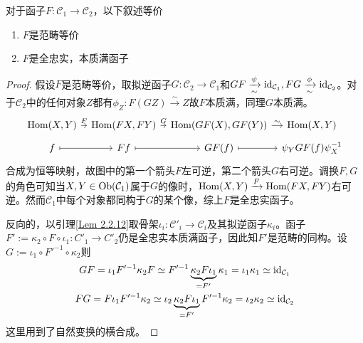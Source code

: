 \begin{Them}\label{Them 2.2.13}
    对于函子$F:\mathcal{C}_1 \to \mathcal{C}_2$，以下叙述等价
    \begin{enumerate}
        \item $F$是范畴等价
        \item $F$是全忠实，本质满函子
    \end{enumerate}
    \begin{proof}
        假设$F$是范畴等价，取拟逆函子$G:\mathcal{C}_2 \to \mathcal{C}_1$和$GF \xrightarrow[\sim]{\psi} \mathrm{id}_{\mathcal{C}_1}, FG\xrightarrow[\sim]{\phi} \mathrm{id}_{\mathcal{C}_2}$。对于$\mathcal{C}_2$中的任何对象$Z$都有$\phi_Z:F(GZ)\xrightarrow{\sim}Z$故$F$本质满，同理$G$本质满。
        \[\begin{tikzcd}[row sep = tiny, column sep = tiny]
            \Hom(X,Y)
                \arrow[r, "F"] &
            \Hom(FX, FY)
                \arrow[r, "G"] &
            \Hom(GF(X), GF(Y))
                \arrow[r, "\sim"] &
            \Hom(X,Y)  \\
            f 
                \arrow[mapsto,r] &
            F f 
                \arrow[mapsto, r] &
            G F(f)
                \arrow[mapsto, r] &
            \psi_Y GF(f) \psi_{X}^{-1}
        \end{tikzcd}\]
        合成为恒等映射，故图中的第一个箭头$F$左可逆，第二个箭头$G$右可逆。调换$F,G$的角色可知当$X,Y\in \operatorname{Ob}(\mathcal{C}_1)$属于$G$的像时，$\operatorname{Hom}(X,Y)\xrightarrow{F} \operatorname{Hom}(FX, FY)$右可逆。然而$\mathcal{C}_1$中每个对象都同构于$G$的某个像，综上$F$是全忠实函子。

        反向的，以引理\ref{Lem 2.2.12}取骨架$\iota_i:\mathcal{C}'_i \to \mathcal{C}_i$及其拟逆函子$\kappa_i$。函子$F':=\kappa_2 \circ F \circ \iota_1: C'_1 \to C'_2$仍是全忠实本质满函子，因此知$F'$是范畴的同构。设$G:=\iota_1 \circ F'^{-1}\circ \kappa_2$则
        \begin{gather*}
            GF=\iota_1 F'^{-1} \kappa_2 F \simeq F'^{-1} \underbrace{\kappa_2 F \iota_1}_{=F'} \kappa_1 = \iota_1 \kappa_1 \simeq \mathrm{id}_{\mathcal{C}_1} \\
            FG=F \iota_1 F'^{-1}\kappa_2 \simeq \iota_2 \underbrace{\kappa_2 F \iota_1}_{=F'} F'^{-1} \kappa_2 = \iota_2 \kappa_2 \simeq \mathrm{id}_{\mathcal{C}_2}
        \end{gather*}
        这里用到了自然变换的横合成。
    \end{proof}
\end{Them}

